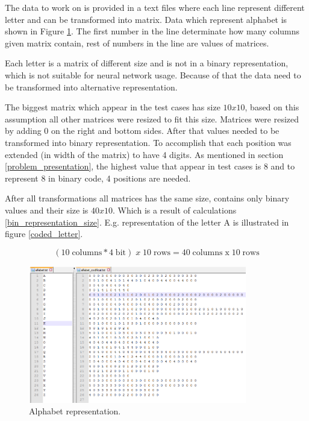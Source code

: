 \documentclass[a4paper, 11pt]{article}
\begin{document}
The data to work on is provided in a text files where each line represent different letter and can be transformed into matrix. Data which represent alphabet is shown in Figure \ref{alphabet}. The first number in the line determinate how many columns given matrix contain, rest of numbers in the line are values of matrices.

Each letter is a matrix of different size and is not in a binary representation, which is not suitable for neural network usage. Because of that the data need to be transformed into alternative representation.

The biggest matrix which appear in the test cases has size \(10x10\), based on this assumption all other matrices were resized to fit this size. Matrices were resized by adding 0 on the right and bottom sides. After that values needed to be transformed into binary representation. To accomplish that each position was extended (in width of the matrix) to have 4 digits. As mentioned in section \ref{problem_presentation}, the highest value that appear in test cases is 8 and to represent 8 in binary code, 4 positions are needed.

After all transformations all matrices has the same size, contains only binary values and their size is \(40x10\). Which is a result of calculations \ref{bin_representation_size}. E.g. representation of the letter A is illustrated in figure \ref{coded_letter}.

\begin{equation}
(\mathrm{10\;columns} * \mathrm{4\;bit})\;x\;\mathrm{10\;rows} = \mathrm{40\;columns\;x\;10\;rows}
\label{bin_representation_size}
\end{equation}

\begin{figure}[ht]
\begin{center}
\includegraphics[width=0.85\textwidth]{images/alphabet}
\caption{Alphabet representation.}
\label{alphabet}
\end{center}
\end{figure}
\end{document}
